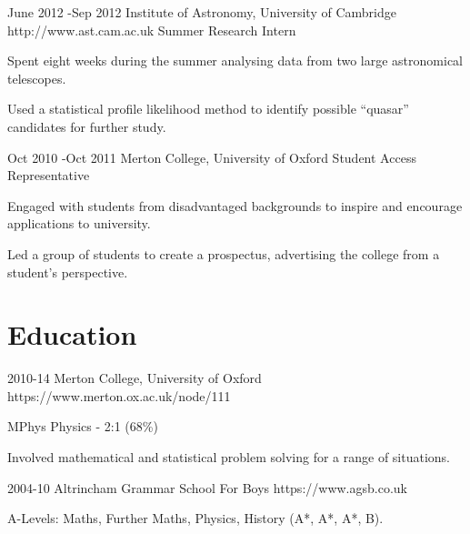 \documentclass[10pt]{article} %
\begin{document}
\job
{June 2012 -}{Sep 2012}
{Institute of Astronomy, University of Cambridge}
{http://www.ast.cam.ac.uk}
{Summer Research Intern}
{\begin{itemize-noindent}
  \item{Spent eight weeks during the summer analysing data from two large astronomical telescopes.}
  \item{Used a statistical profile likelihood method to identify possible ``quasar'' candidates for further study.}
\end{itemize-noindent}}

\job
{Oct 2010 -}{Oct 2011}
{Merton College, University of Oxford}
{}
{Student Access Representative}
{\begin{itemize-noindent}
  \item{Engaged with students from disadvantaged backgrounds to inspire and encourage applications to university.}
  \item{Led a group of students to create a prospectus, advertising the college from a student's perspective.}
 \end{itemize-noindent}}


\section{Education}
\edu
{2010-14}
{Merton College, University of Oxford}
{https://www.merton.ox.ac.uk/node/111}
{
  \begin{itemize-noindent}
  \item{MPhys Physics - 2:1 (68\%)}
  \item{Involved mathematical and statistical problem solving for a range of situations.}
  \end{itemize-noindent}
}

\edu
{2004-10}
{Altrincham Grammar School For Boys}
{https://www.agsb.co.uk}
{
  \begin{itemize-noindent}
  \item{A-Levels: Maths, Further Maths, Physics, History (A*, A*, A*, B).}
  \end{itemize-noindent}
}

\end{document}
